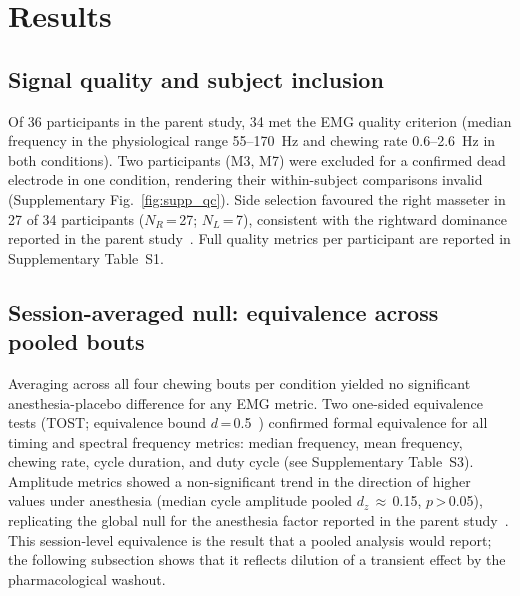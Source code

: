 ﻿\section*{Results}

\subsection*{Signal quality and subject inclusion}

Of 36 participants in the parent study, 34 met the EMG quality criterion
(median frequency in the physiological range 55--170~Hz and chewing rate
0.6--2.6~Hz in both conditions).
Two participants (M3, M7) were excluded for a confirmed dead electrode in one
condition, rendering their within-subject comparisons invalid
(Supplementary Fig.~\ref{fig:supp_qc}).
Side selection favoured the right masseter in 27 of 34 participants
($N_R$\,=\,27; $N_L$\,=\,7), consistent with the rightward dominance
reported in the parent study~\cite{espinoza2025}.
Full quality metrics per participant are reported in Supplementary Table~S1.

\subsection*{Session-averaged null: equivalence across pooled bouts}

Averaging across all four chewing bouts per condition yielded no significant
anesthesia-placebo difference for any EMG metric.
Two one-sided equivalence tests (TOST; equivalence bound $d$\,=\,0.5~\cite{Lakens2017})
confirmed formal equivalence for all timing and spectral frequency metrics:
median frequency, mean frequency, chewing rate, cycle duration, and duty cycle
(see Supplementary Table~S3).
Amplitude metrics showed a non-significant trend in the direction of higher values
under anesthesia (median cycle amplitude pooled $d_z$\,$\approx$\,0.15,
$p$\,>\,0.05), replicating the global null for the anesthesia factor reported in
the parent study~\cite{espinoza2025}.
This session-level equivalence is the result that a pooled analysis would
report; the following subsection shows that it reflects dilution of a
transient effect by the pharmacological washout.

